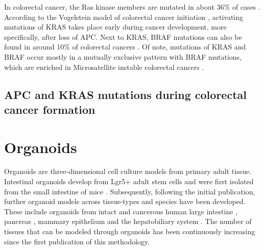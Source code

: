 \begin{flushleft}
In colorectal cancer, the Ras kinase members are mutated in about 36\% of cases \cite{Oncol2005}. According to the Vogelstein model of colorectal cancer initiation \cite{Fearon1989}, activating mutations of KRAS takes place early during cancer development, more specifically, after loss of APC.
Next to KRAS, BRAF mutations can also be found in around 10\% of colorectal cancers \cite{Oncol2005}. Of note, mutations of KRAS and BRAF occur mostly in a mutually exclusive pattern with BRAF mutations, which are enriched in Microsatellite instable colorectal cancers \cite{Oncol2005, Sahin2013}. 

\subsection{APC and KRAS mutations during colorectal cancer formation}


\section{Organoids}

Organoids are three-dimensional cell culture models from primary adult tissue. Intestinal organoids develop from Lgr5+ adult stem cells and were first isolated from the small intestine of mice \cite{Sato2011}. Subsequently, following the initial publication, further organoid models across tissue-types and species have been developed. These include organoids from intact and cancerous human large intestine \cite{Sato2011}, pancreas \cite{Sachs2017}, mammary epithelium \cite{Zhang2016EstablishingCells, Sachs2017AHeterogeneity} and the hepatobiliary system \cite{Huch2013NIHAccess, Broutier2016CultureManipulation.}. The number of tissues that can be modeled through organoids has been continuously increasing since the first publication of this methodology. \par


\end{flushleft}
